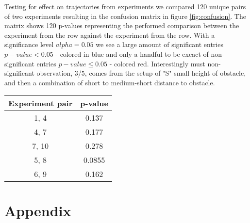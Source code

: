 \documentclass{article}
\begin{document}
Testing for effect on trajectories from experiments we compared 120 unique pairs of two experiments resulting in the confusion matrix in figure \ref{fig:confusion}. The matrix shows 120 p-values representing the performed comparison between the experiment from the row against the experiment from the row. With a significance level $alpha = 0.05$ we see a large amount of significant entries $p-value < 0.05$ - colored in blue and only a handful to be excact of non-significant entries $p-value \leq 0.05$ - colored red. Interestingly must non-significant observation, 3/5, comes from the setup of "S" small height of obstacle, and then a combination of short to medium-short distance to obstacle.

\begin{table}[H]
\begin{tabular}{cc}\toprule[1.5pt]
\textbf{Experiment pair} & \textbf{p-value} \\\midrule[1.25pt]
1, 4         	& 0.137            \\\midrule
4, 7  		& 0.177            \\\midrule
7, 10           	& 0.278            \\\midrule
5, 8        	& 0.0855           \\\midrule
6, 9      	& 0.162           \\\bottomrule[1.25pt]
\end{tabular}
\end{table}

\section{Appendix}
\end{document}
